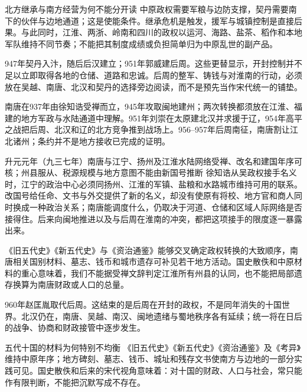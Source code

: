 \begin{causalchain}{北方继承与南方经营为何不能分开读}
中原政权需要军粮与边防支撑，契丹需要南下的伙伴与边地通道；这是使能条件。继承危机是触发，援军与城镇控制是直接后果。与此同时，江淮、两浙、岭南和四川的政权以运河、海路、盐茶、稻作和本地军队维持不同节奏；不能把其制度成绩或负担简单归为中原乱世的副产品。
\end{causalchain}

947年契丹入汴，随后后汉建立；951年郭威建后周。这些更替显示，开封控制并不足以立即取得各地的仓储、道路和忠诚。后周的整军、铸钱与对淮南的行动，必须放在吴越、南唐、北汉和契丹的选择旁边阅读，而不是预先当作宋代统一的铺垫。

南唐在937年由徐知诰受禅而立，945年攻取闽地建州；两次转换都须放在江淮、福建的地方军政与水陆通道中理解。951年刘崇在太原建北汉并求援于辽，954年高平之战把后周、北汉和辽的北方竞争推到战场上。956--957年后周南征，南唐割让江北诸州；条约并不是地方接收已完成的证明。

\begin{event}{}{升元元年（九三七年）}{南唐与江宁、扬州及江淮水陆网络}{受禅、改名和建国年序可核；州县服从、税源规模与地方意图不能由新国号推断}
徐知诰从吴政权接手名义时，江宁的政治中心必须同扬州、江淮的军镇、盐粮和水路城市维持可用的联系。改国号给任命、文书与外交提供了新的名义，却没有使原有将校、地方官和商人同时换成一种政治关系；南唐能调度什么，仍取决于河道、仓储和区域人际网络是否接得住。后来向闽地推进以及与后周在淮南的冲突，都把这项接手的限度逐一暴露出来。

《旧五代史》《新五代史》与《资治通鉴》能够交叉确定政权转换的大致顺序，南唐相关国别材料、墓志、钱币和城市遗存可补见若干地方活动。国史散佚和中原材料的重心意味着，我们不能据受禅文辞判定江淮所有州县的认同，也不能把局部遗存换算为南唐财政或人口的总量。
\end{event}

960年赵匡胤取代后周。这结束的是后周在开封的政权，不是同年消失的十国世界。北汉仍在，南唐、吴越、南汉、闽地遗绪与蜀地秩序各有延续；统一将在日后的战争、协商和财政接管中逐步发生。

\begin{sourcenote}{五代十国的材料为何特别不均衡}
《旧五代史》《新五代史》《资治通鉴》及《考异》维持中原年序；地方碑刻、墓志、钱币、城址和残存文书使南方与边地的一部分实践可见。国史散佚和后来的宋代视角意味着：对十国的财政、人口与社会，常只能作有限判断，不能把沉默写成不存在。
\end{sourcenote}

